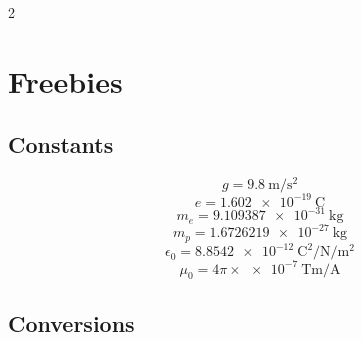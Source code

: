 \begin{multicols*}{2}
\section{Freebies}\label{sec:freebies}


\subsection{Constants}

\begin{equation*}
    g = \qty{9.8}{\meter\per\square\second}
\end{equation*}
\begin{equation*}
    e = \qty{1.602e-19}{\coulomb}
\end{equation*}
\begin{equation*}
    m_e = \qty{9.109387e-31}{\kilo\gram}
\end{equation*}
\begin{equation*}
    m_p = \qty{1.6726219e-27}{\kilo\gram}
\end{equation*}
\begin{equation*}
    \epsilon_0 = \qty{8.8542e-12}{\square\coulomb\per\newton\per\square\meter}
\end{equation*}
\begin{equation*}
    \mu_0 = 4\pi\times\qty{e-7}{\tesla\meter\per\ampere}
\end{equation*}

\subsection{Conversions}


\end{multicols*}
